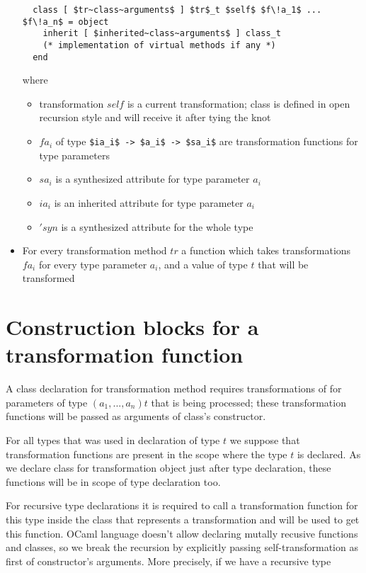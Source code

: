 \documentclass[acmsmall,review,anonymous]{acmart}\settopmatter{printfolios=true,printccs=false,printacmref=false}
\begin{document}
\begin{itemize}
  \begin{lstlisting}
  class [ $tr~class~arguments$ ] $tr$_t $self$ $f\!a_1$ ... $f\!a_n$ = object
    inherit [ $inherited~class~arguments$ ] class_t
    (* implementation of virtual methods if any *)
  end
  \end{lstlisting}
  where \begin{itemize}
          \item transformation $self$ is a current transformation; class is defined in open recursion style and will receive it after tying the knot
          \item $f\!a_i$ of type \lstinline{$ia_i$ -> $a_i$ -> $sa_i$} are transformation functions for type parameters
          \item $sa_i$ is a synthesized attribute for type parameter $a_i$
          \item $ia_i$ is an inherited attribute for type parameter $a_i$
          \item $'syn$ is a synthesized attribute for the whole type
  \end{itemize}
  \item For every transformation method $tr$ a function which takes transformations $f\!a_i$ for every type parameter $a_i$, and a value of type $t$ that will be transformed
\end{itemize}

\section{Construction blocks for a transformation function}
A class declaration for transformation method requires transformations of for parameters of type $(a_1,...,a_n) t$ that is being processed; these transformation functions will be passed as arguments of class's constructor.

For all types that was used in declaration of type $t$ we suppose that transformation functions are present in the scope where the type $t$ is declared. As we declare class for transformation object just after type declaration, these functions will be in scope of type declaration too.

For recursive type declarations it is required to call a transformation function for this type inside the class that represents a transformation and will be used to get this function. OCaml language doesn't allow declaring mutally recusive functions and classes, so we break the recursion by explicitly passing self-transformation as first of constructor's arguments. More precisely, if we have a recursive type 
\end{document}
